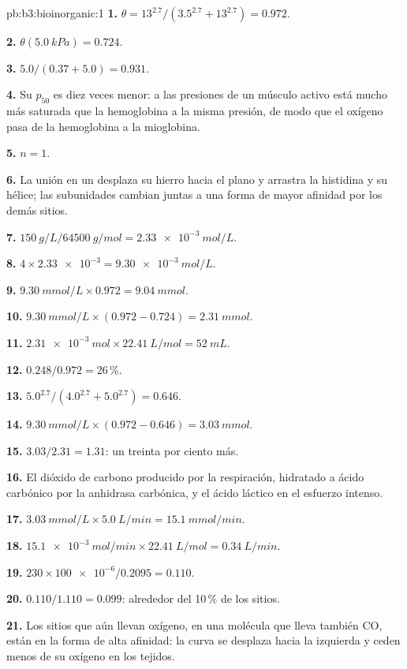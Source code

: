 \begin{solution}{pb:b3:bioinorganic:1}
\textbf{1.} $\theta = 13^{2.7}/(3.5^{2.7} + 13^{2.7}) = 0.972$.

\textbf{2.} $\theta(\qty{5.0}{kPa}) = 0.724$.

\textbf{3.} $5.0/(0.37 + 5.0) = 0.931$.

\textbf{4.} Su $p_{50}$ es diez veces menor: a las presiones de un músculo activo está mucho más
saturada que la hemoglobina a la misma presión, de modo que el oxígeno pasa de la
hemoglobina a la mioglobina.

\textbf{5.} $n = 1$.

\textbf{6.} La unión en un  desplaza su hierro hacia el plano y arrastra la histidina y
su hélice; las subunidades cambian juntas a una forma de mayor afinidad por los
demás sitios.

\textbf{7.} $\qty{150}{g/L}/\qty{64500}{g/mol} = \qty{2.33e-3}{mol/L}$.

\textbf{8.} $4 \times \num{2.33e-3} = \qty{9.30e-3}{mol/L}$.

\textbf{9.} $\qty{9.30}{mmol/L} \times 0.972 = \qty{9.04}{mmol}$.

\textbf{10.} $\qty{9.30}{mmol/L} \times (0.972 - 0.724) = \qty{2.31}{mmol}$.

\textbf{11.} $\qty{2.31e-3}{mol} \times \qty{22.41}{L/mol} = \qty{52}{mL}$.

\textbf{12.} $0.248/0.972 = 26$\,\%.

\textbf{13.} $5.0^{2.7}/(4.0^{2.7} + 5.0^{2.7}) = 0.646$.

\textbf{14.} $\qty{9.30}{mmol/L} \times (0.972 - 0.646) = \qty{3.03}{mmol}$.

\textbf{15.} $3.03/2.31 = 1.31$: un treinta por ciento más.

\textbf{16.} El dióxido de carbono producido por la respiración, hidratado a ácido carbónico por la
anhidrasa carbónica, y el ácido láctico en el esfuerzo intenso.

\textbf{17.} $\qty{3.03}{mmol/L} \times \qty{5.0}{L/min} = \qty{15.1}{mmol/min}$.

\textbf{18.} $\qty{15.1e-3}{mol/min} \times \qty{22.41}{L/mol} = \qty{0.34}{L/min}$.

\textbf{19.} $230 \times \num{100e-6}/0.2095 = 0.110$.

\textbf{20.} $0.110/1.110 = 0.099$: alrededor del 10\,\% de los sitios.

\textbf{21.} Los sitios que aún llevan oxígeno, en una molécula que lleva también CO, están en
la forma de alta afinidad: la curva se desplaza hacia la izquierda y ceden menos de
su oxígeno en los tejidos.


\end{solution}
